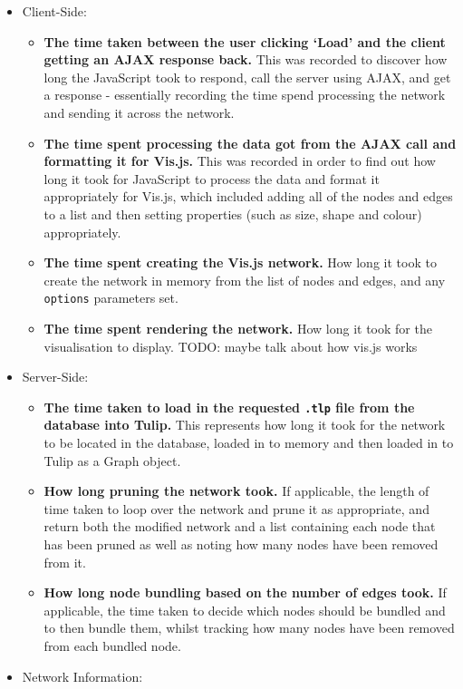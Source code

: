 \documentclass[../dissertation.tex]{subfiles}
\begin{document}
\begin{itemize}
    \item Client-Side:
    \begin{itemize}
        \item \textbf{The time taken between the user clicking `Load' and the client getting an AJAX response back.} This was recorded to discover how long the JavaScript took to respond, call the server using AJAX, and get a response - essentially recording the time spend processing the network and sending it across the network.
        \item \textbf{The time spent processing the data got from the AJAX call and formatting it for Vis.js.} This was recorded in order to find out how long it took for JavaScript to process the data and format it appropriately for Vis.js, which included adding all of the nodes and edges to a list and then setting properties (such as size, shape and colour) appropriately.
        \item \textbf{The time spent creating the Vis.js network.} How long it took to create the network in memory from the list of nodes and edges, and any \texttt{options} parameters set.
        \item \textbf{The time spent rendering the network.} How long it took for the visualisation to display. TODO: maybe talk about how vis.js works
    \end{itemize}
    \item Server-Side:
    \begin{itemize}
        \item \textbf{The time taken to load in the requested \texttt{.tlp} file from the database into Tulip.} This represents how long it took for the network to be located in the database, loaded in to memory and then loaded in to Tulip as a Graph object.
        \item \textbf{How long pruning the network took.} If applicable, the length of time taken to loop over the network and prune it as appropriate, and return both the modified network and a list containing each node that has been pruned as well as noting how many nodes have been removed from it.
        \item \textbf{How long node bundling based on the number of edges took.}  If applicable, the time taken to decide which nodes should be bundled and to then bundle them, whilst tracking how many nodes have been removed from each bundled node.
    \end{itemize}
    \item Network Information:

\end{itemize}
\end{document}
